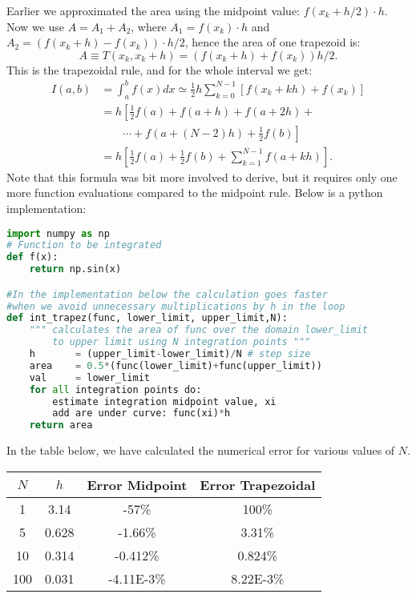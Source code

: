 \documentclass[graybox,sectrefs,envcountresetchap,open=right,final]{svmonodo}
\begin{document}
Earlier we approximated the area using the midpoint value: $f(x_k+h/2)\cdot h$. Now we use $A=A_1+A_2$, where $A_1=f(x_k)\cdot h$ 
and $A_2=(f(x_k+h)-f(x_k))\cdot h/2$, hence the area of one trapezoid is:
\begin{equation}
A\equiv T(x_k,x_k+h)=(f(x_k+h)+f(x_k))h/2.
\end{equation}
This is the trapezoidal rule, and for the whole interval we get:
\begin{align}
I(a,b)&=\int_a^bf(x)dx\simeq\frac{1}{2}h\sum_{k=0}^{N-1}\left[f(x_k+k h)+f(x_k)\right] \nonumber \\ 
&=h\left[\frac{1}{2}f(a)+f(a+h) + f(a+2h) +\nonumber\right. \\ 
&\left.\qquad\cdots + f(a+(N-2)h)+\frac{1}{2}f(b)\right]\nonumber \\ 
&=h\left[\frac{1}{2}f(a)+\frac{1}{2}f(b)+\sum_{k=1}^{N-1}f(a+k h)\right].
\end{align}
Note that this formula was bit more involved to derive, but it requires only one more function evaluations compared to the midpoint rule. 
Below is a python implementation:
\begin{lstlisting}[language=Python,style=blue1bar]
import numpy as np
# Function to be integrated
def f(x):
    return np.sin(x)

#In the implementation below the calculation goes faster 
#when we avoid unnecessary multiplications by h in the loop
def int_trapez(func, lower_limit, upper_limit,N):
    """ calculates the area of func over the domain lower_limit
        to upper limit using N integration points """
    h       = (upper_limit-lower_limit)/N # step size
    area    = 0.5*(func(lower_limit)+func(upper_limit))
    val     = lower_limit
    for all integration points do:
        estimate integration midpoint value, xi
        add are under curve: func(xi)*h
    return area
\end{lstlisting}

In the table below, we have calculated the numerical error for various values of $N$.



{\small   %

\vspace{4mm}

\begin{tabular}{cccc}
\hline
\multicolumn{1}{c}{ $N$ } & \multicolumn{1}{c}{ $h$ } & \multicolumn{1}{c}{ Error Midpoint } & \multicolumn{1}{c}{ Error Trapezoidal } \\
\hline
1   & 3.14  & -57\%          & 100\%             \\
5   & 0.628 & -1.66\%        & 3.31\%            \\
10  & 0.314 & -0.412\%       & 0.824\%           \\
100 & 0.031 & -4.11E-3\%     & 8.22E-3\%         \\
\hline
\end{tabular}

\vspace{4mm}

}
\end{document}
